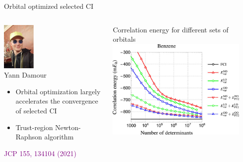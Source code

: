 \documentclass[aspectratio=169,9pt]{beamer}
\newcommand{\pub}[1]{{\small \textcolor{purple}{#1}}}
\begin{document}
\begin{frame}{Orbital optimized selected CI}

\begin{columns}

\begin{column}{0.5\textwidth}

\centering
\includegraphics[width=0.3\textwidth]{fig/Yann.jpg}
\\
Yann Damour
\\

\begin{itemize}
	\item Orbital optimization largely accelerates the convergence of selected CI
                        \bigskip
	\item Trust-region Newton-Raphson algorithm
                        \bigskip
\end{itemize}
			\bigskip
                        \centering
			\pub{JCP 155, 134104 (2021)}
\end{column}

                \begin{column}{0.5\textwidth}
                        \centering
			\begin{block}{Correlation energy for different sets of orbitals}
                        \includegraphics[width=0.9\textwidth]{fig/oocipsi_benzene.jpeg}
                        \\
                        \bigskip
                        \end{block}
                \end{column}


\end{columns}
\end{frame}
\end{document}
